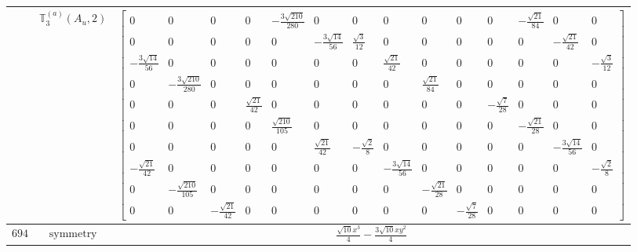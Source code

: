 \documentclass[fleqn,8pt,landscape]{jsarticle}
\begin{document}
\begin{longtable}{ccc}
$  $ & $ \mathbb{T}_{3}^{(a)}(A_{u},2) $ & $ \begin{bmatrix} 0 & 0 & 0 & 0 & - \frac{3 \sqrt{210}}{280} & 0 & 0 & 0 & 0 & 0 & 0 & - \frac{\sqrt{21}}{84} & 0 & 0 \\ 0 & 0 & 0 & 0 & 0 & - \frac{3 \sqrt{14}}{56} & \frac{\sqrt{3}}{12} & 0 & 0 & 0 & 0 & 0 & - \frac{\sqrt{21}}{42} & 0 \\ - \frac{3 \sqrt{14}}{56} & 0 & 0 & 0 & 0 & 0 & 0 & \frac{\sqrt{21}}{42} & 0 & 0 & 0 & 0 & 0 & - \frac{\sqrt{3}}{12} \\ 0 & - \frac{3 \sqrt{210}}{280} & 0 & 0 & 0 & 0 & 0 & 0 & \frac{\sqrt{21}}{84} & 0 & 0 & 0 & 0 & 0 \\ 0 & 0 & 0 & \frac{\sqrt{21}}{42} & 0 & 0 & 0 & 0 & 0 & 0 & - \frac{\sqrt{7}}{28} & 0 & 0 & 0 \\ 0 & 0 & 0 & 0 & \frac{\sqrt{210}}{105} & 0 & 0 & 0 & 0 & 0 & 0 & - \frac{\sqrt{21}}{28} & 0 & 0 \\ 0 & 0 & 0 & 0 & 0 & \frac{\sqrt{21}}{42} & - \frac{\sqrt{2}}{8} & 0 & 0 & 0 & 0 & 0 & - \frac{3 \sqrt{14}}{56} & 0 \\ - \frac{\sqrt{21}}{42} & 0 & 0 & 0 & 0 & 0 & 0 & - \frac{3 \sqrt{14}}{56} & 0 & 0 & 0 & 0 & 0 & - \frac{\sqrt{2}}{8} \\ 0 & - \frac{\sqrt{210}}{105} & 0 & 0 & 0 & 0 & 0 & 0 & - \frac{\sqrt{21}}{28} & 0 & 0 & 0 & 0 & 0 \\ 0 & 0 & - \frac{\sqrt{21}}{42} & 0 & 0 & 0 & 0 & 0 & 0 & - \frac{\sqrt{7}}{28} & 0 & 0 & 0 & 0 \end{bmatrix} $ \\ \hline
$ 694 $ & $ \text{symmetry} $ & $ \frac{\sqrt{10} x^{3}}{4} - \frac{3 \sqrt{10} x y^{2}}{4} $ \\

\end{longtable}
\end{document}
